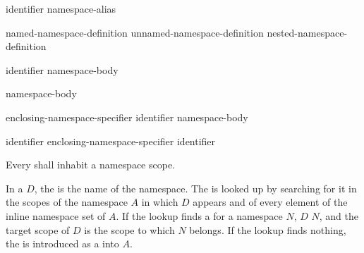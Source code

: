 \begin{bnf}
\br
        identifier\br
        namespace-alias
\end{bnf}

\begin{bnf}
\br
        named-namespace-definition\br
        unnamed-namespace-definition\br
        nested-namespace-definition
\end{bnf}

\begin{bnf}
\br
           identifier \terminal{\{} namespace-body \terminal{\}}
\end{bnf}

\begin{bnf}
\br
           \terminal{\{} namespace-body \terminal{\}}
\end{bnf}

\begin{bnf}
\br
         enclosing-namespace-specifier \terminal{::}  identifier \terminal{\{} namespace-body \terminal{\}}
\end{bnf}

\begin{bnf}
\br
        identifier\br
        enclosing-namespace-specifier \terminal{::}  identifier
\end{bnf}

\begin{bnf}
\br
\end{bnf}

\pnum
Every  shall inhabit a namespace scope.

\pnum
In a  $D$,
the  is the name of the namespace.
The  is looked up
by searching for it in the scopes of the namespace $A$
in which $D$ appears
and of every element of the inline namespace set of $A$.
If the lookup finds a  for a namespace $N$,
%
$D$  $N$,
and the target scope of $D$ is the scope to which $N$ belongs.
If the lookup finds nothing, the  is introduced
as a  into $A$.

